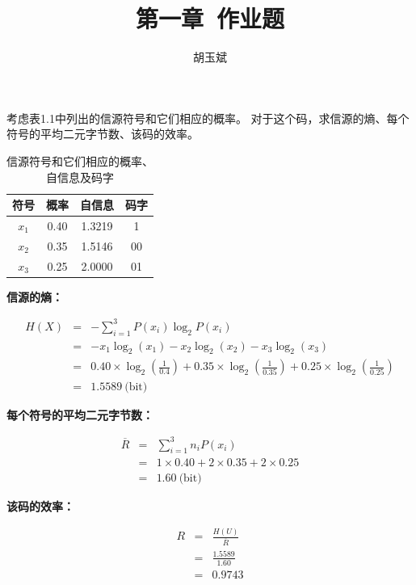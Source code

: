 \documentclass[onecolumn,oneside]{BUPTHomework}
\author{胡玉斌}
\title{第一章\ 作业题}
\begin{document}
  \maketitle
  
  \begin{problem}[5]
  {
    考虑表1.1中列出的信源符号和它们相应的概率。
    对于这个码，求信源的熵、每个符号的平均二元字节数、该码的效率。

    \begin{table}[!htbp]
      \centering
      \begin{tabular}{|c|c|c|c|}
      \hline
      符号    & 概率   & 自信息    & 码字 \\ \hline
      $x_1$ & 0.40 & 1.3219 & 1  \\ \hline
      $x_2$ & 0.35 & 1.5146 & 00 \\ \hline
      $x_3$ & 0.25 & 2.0000 & 01 \\ \hline
      \end{tabular}
      \caption{信源符号和它们相应的概率、自信息及码字}
    \end{table}
  }
  \end{problem}

  \begin{solution}
  {
    \textbf{\textsf{信源的熵：}}
    
    \begin{eqnarray} 
      H(X) &=& -\sum_{i=1}^{3}P(x_i)\log_2 P(x_i) \nonumber \\
      &=& -x_1\log_2 (x_1)-x_2\log_2 (x_2)-x_3\log_2 (x_3) \nonumber \\
      &=& 0.40\times \log_2 (\frac{1}{0.4})+0.35\times \log_2 (\frac{1}{0.35})+0.25\times \log_2 (\frac{1}{0.25}) \nonumber \\
      &=& 1.5589\ \mbox{(bit)} \nonumber
    \end{eqnarray}

    \textbf{\textsf{每个符号的平均二元字节数：}}

    \begin{eqnarray} 
      \overline{R} &=& \sum_{i=1}^{3}n_iP(x_i) \nonumber \\
      &=& 1 \times 0.40 + 2 \times 0.35 + 2 \times 0.25 \nonumber \\
      &=& 1.60\ \mbox{(bit)} \nonumber
    \end{eqnarray}

    \textbf{\textsf{该码的效率：}}

    \begin{eqnarray} 
      R &=& \frac{H(U)}{\overline{R}} \nonumber \\
      &=& \frac{1.5589}{1.60} \nonumber \\
      &=& 0.9743 \nonumber
    \end{eqnarray}
  }
  \end{solution}
\end{document}
